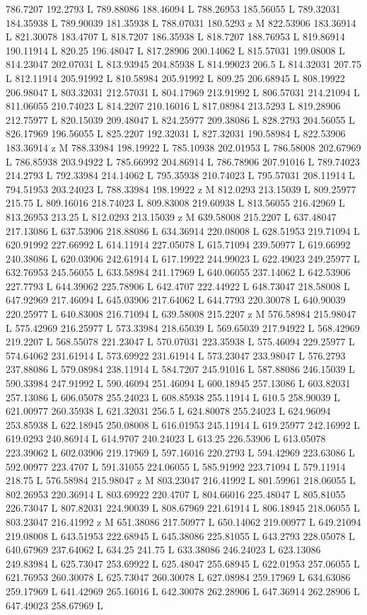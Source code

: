 {\begin{scope}[local bounding box=bb]
{786.7207 192.2793 L 789.88086 188.46094 L 788.26953 185.56055 L 789.32031 184.35938 L 789.90039 181.35938 L 788.07031 180.5293 z M 822.53906 183.36914 L 821.30078 183.4707 L 818.7207 186.35938 L 818.7207 188.76953 L 819.86914 190.11914 L 820.25 196.48047 L 817.28906 200.14062 L 815.57031 199.08008 L 814.23047 202.07031 L 813.93945 204.85938 L 814.99023 206.5 L 814.32031 207.75 L 812.11914 205.91992 L 810.58984 205.91992 L 809.25 206.68945 L 808.19922 206.98047 L 803.32031 212.57031 L 804.17969 213.91992 L 806.57031 214.21094 L 811.06055 210.74023 L 814.2207 210.16016 L 817.08984 213.5293 L 819.28906 212.75977 L 820.15039 209.48047 L 824.25977 209.38086 L 828.2793 204.56055 L 826.17969 196.56055 L 825.2207 192.32031 L 827.32031 190.58984 L 822.53906 183.36914 z M 788.33984 198.19922 L 785.10938 202.01953 L 786.58008 202.67969 L 786.85938 203.94922 L 785.66992 204.86914 L 786.78906 207.91016 L 789.74023 214.2793 L 792.33984 214.14062 L 795.35938 210.74023 L 795.57031 208.11914 L 794.51953 203.24023 L 788.33984 198.19922 z M 812.0293 213.15039 L 809.25977 215.75 L 809.16016 218.74023 L 809.83008 219.60938 L 813.56055 216.42969 L 813.26953 213.25 L 812.0293 213.15039 z M 639.58008 215.2207 L 637.48047 217.13086 L 637.53906 218.88086 L 634.36914 220.08008 L 628.51953 219.71094 L 620.91992 227.66992 L 614.11914 227.05078 L 615.71094 239.50977 L 619.66992 240.38086 L 620.03906 242.61914 L 617.19922 244.99023 L 622.49023 249.25977 L 632.76953 245.56055 L 633.58984 241.17969 L 640.06055 237.14062 L 642.53906 227.7793 L 644.39062 225.78906 L 642.4707 222.44922 L 648.73047 218.58008 L 647.92969 217.46094 L 645.03906 217.64062 L 644.7793 220.30078 L 640.90039 220.25977 L 640.83008 216.71094 L 639.58008 215.2207 z M 576.58984 215.98047 L 575.42969 216.25977 L 573.33984 218.65039 L 569.65039 217.94922 L 568.42969 219.2207 L 568.55078 221.23047 L 570.07031 223.35938 L 575.46094 229.25977 L 574.64062 231.61914 L 573.69922 231.61914 L 573.23047 233.98047 L 576.2793 237.88086 L 579.08984 238.11914 L 584.7207 245.91016 L 587.88086 246.15039 L 590.33984 247.91992 L 590.46094 251.46094 L 600.18945 257.13086 L 603.82031 257.13086 L 606.05078 255.24023 L 608.85938 255.11914 L 610.5 258.90039 L 621.00977 260.35938 L 621.32031 256.5 L 624.80078 255.24023 L 624.96094 253.85938 L 622.18945 250.08008 L 616.01953 245.11914 L 619.25977 242.16992 L 619.0293 240.86914 L 614.9707 240.24023 L 613.25 226.53906 L 613.05078 223.39062 L 602.03906 219.17969 L 597.16016 220.2793 L 594.42969 223.63086 L 592.00977 223.4707 L 591.31055 224.06055 L 585.91992 223.71094 L 579.11914 218.75 L 576.58984 215.98047 z M 803.23047 216.41992 L 801.59961 218.06055 L 802.26953 220.36914 L 803.69922 220.4707 L 804.66016 225.48047 L 805.81055 226.73047 L 807.82031 224.90039 L 808.67969 221.61914 L 806.18945 218.06055 L 803.23047 216.41992 z M 651.38086 217.50977 L 650.14062 219.00977 L 649.21094 219.08008 L 643.51953 222.68945 L 645.38086 225.81055 L 643.2793 228.05078 L 640.67969 237.64062 L 634.25 241.75 L 633.38086 246.24023 L 623.13086 249.83984 L 625.73047 253.69922 L 625.48047 255.68945 L 622.01953 257.06055 L 621.76953 260.30078 L 625.73047 260.30078 L 627.08984 259.17969 L 634.63086 259.17969 L 641.42969 265.16016 L 642.30078 262.28906 L 647.36914 262.28906 L 647.49023 258.67969 L }
\end{scope}}
